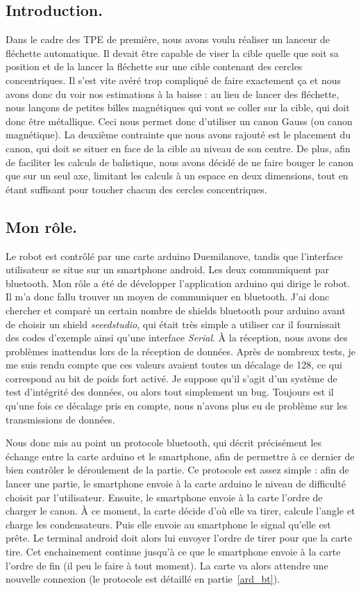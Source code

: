 \subsection{Introduction.}
Dans le cadre des TPE de première, nous avons voulu réaliser un lanceur de fléchette automatique. Il devait être capable de viser la cible quelle que soit sa position et de la lancer la fléchette sur une cible contenant des cercles concentriques. Il s'est vite avéré trop compliqué de faire exactement ça et nous avons donc du voir nos estimations à la baisse : au lieu de lancer des fléchette, nous lançons de petites billes magnétiques qui vont se coller sur la cible, qui doit donc être métallique. Ceci nous permet donc d'utiliser un canon Gauss (ou canon magnétique). La deuxième contrainte que nous avons rajouté est le placement du canon, qui doit se situer en face de la cible au niveau de son centre. De plus, afin de faciliter les calculs de balistique, nous avons décidé de ne faire bouger le canon que sur un seul axe, limitant les calculs à un espace en deux dimensions, tout en étant suffisant pour toucher chacun des cercles concentriques.

\subsection{Mon rôle.}
Le robot est contrôlé par une carte arduino Duemilanove, tandis que l'interface utilisateur se situe sur un smartphone android. Les deux communiquent par bluetooth. Mon rôle a été de développer l'application arduino qui dirige le robot. Il m'a donc fallu trouver un moyen de communiquer en bluetooth. J'ai donc chercher et comparé un certain nombre de shields bluetooth pour arduino avant de choisir un shield \emph{seeedstudio}, qui était très simple a utiliser car il fournissait des codes d'exemple ainsi qu'une interface \emph{Serial}. À la réception, nous avons des problèmes inattendus lors de la réception de données. Après de nombreux tests, je me suis rendu compte que ces valeurs avaient toutes un décalage de 128, ce qui correspond au bit de poids fort activé. Je suppose qu'il s'agit d'un système de test d'intégrité des données, ou alors tout simplement un bug. Toujours est il qu'une fois ce décalage pris en compte, nous n'avons plus eu de problème sur les transmissions de données.

Nous donc mis au point un protocole bluetooth, qui décrit précisément les échange entre la carte arduino et le smartphone, afin de permettre à ce dernier de bien contrôler le déroulement de la partie. Ce protocole est assez simple : afin de lancer une partie, le smartphone envoie à la carte arduino le niveau de difficulté choisit par l'utilisateur. Ensuite, le smartphone envoie à la carte l'ordre de charger le canon. À ce moment, la carte décide d'où elle va tirer, calcule l'angle et charge les condensateurs. Puis elle envoie au smartphone le signal qu'elle est prête. Le terminal android doit alors lui envoyer l'ordre de tirer pour que la carte tire. Cet enchainement continue jusqu'à ce que le smartphone envoie à la carte l'ordre de fin (il peu le faire à tout moment). La carte va alors attendre une nouvelle connexion (le protocole est détaillé en partie~\ref{ard_bt}).

